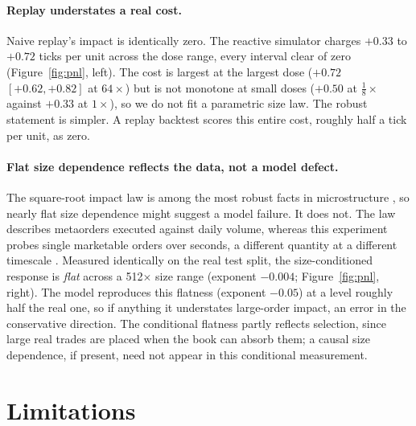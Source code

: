 \documentclass[11pt]{article}
\begin{document}
\paragraph{Replay understates a real cost.} Naive replay's impact is identically zero. The reactive simulator charges $+0.33$ to $+0.72$ ticks per unit across the dose range, every interval clear of zero (Figure~\ref{fig:pnl}, left). The cost is largest at the largest dose ($+0.72$ $[+0.62, +0.82]$ at $64\times$) but is not monotone at small doses ($+0.50$ at $\tfrac{1}{8}\times$ against $+0.33$ at $1\times$), so we do not fit a parametric size law. The robust statement is simpler. A replay backtest scores this entire cost, roughly half a tick per unit, as zero.

\paragraph{Flat size dependence reflects the data, not a model defect.} The square-root impact law is among the most robust facts in microstructure \citep{toth2011}, so nearly flat size dependence might suggest a model failure. It does not. The law describes metaorders executed against daily volume, whereas this experiment probes single marketable orders over seconds, a different quantity at a different timescale \citep{bouchaud2009}. Measured identically on the real test split, the size-conditioned response is \emph{flat} across a 512$\times$ size range (exponent $-0.004$; Figure~\ref{fig:pnl}, right). The model reproduces this flatness (exponent $-0.05$) at a level roughly half the real one, so if anything it understates large-order impact, an error in the conservative direction. The conditional flatness partly reflects selection, since large real trades are placed when the book can absorb them; a causal size dependence, if present, need not appear in this conditional measurement.

\section{Limitations}
\label{sec:limits}
\end{document}
